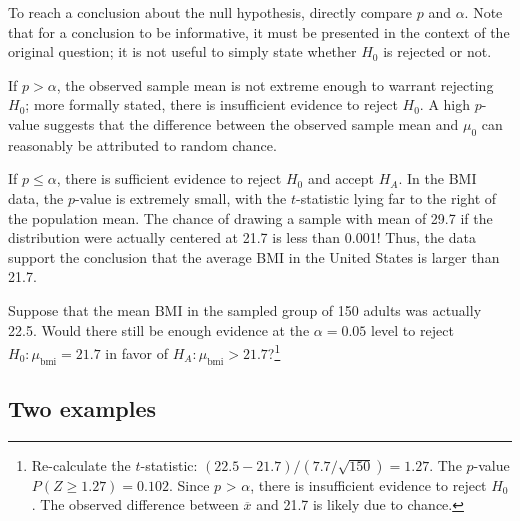 \begin{spacing}{1.5}
To reach a conclusion about the null hypothesis, directly compare $p$ and $\alpha$. Note that for a conclusion to be informative, it must be presented in the context of the original question; it is not useful to simply state whether $H_0$ is rejected or not.

If $p > \alpha$, the observed sample mean is not extreme enough to warrant rejecting $H_0$; more formally stated, there is insufficient evidence to reject $H_0$. A high $p$-value suggests that the difference between the observed sample mean and $\mu_0$ can reasonably be attributed to random chance.

If $p \leq \alpha$, there is sufficient evidence to reject $H_0$ and accept $H_A$. In the  BMI data, the $p$-value is extremely small, with the $t$-statistic lying far to the right of the population mean. The chance of drawing a sample with mean of 29.7 if the distribution were actually centered at 21.7 is less than 0.001! Thus, the data support the conclusion that the average BMI in the United States is larger than 21.7. 

\begin{exercise}
Suppose that the mean BMI in the sampled group of 150 adults was actually 22.5. Would there still be enough evidence at the $\alpha = 0.05$ level to reject $H_0: \mu_{\text{bmi}} = 21.7$ in favor of $H_A: \mu_{\text{bmi}} > 21.7$?\footnote{Re-calculate the $t$-statistic: $(22.5 - 21.7)/(7.7/\sqrt{150}) = 1.27$. The $p$-value $P(Z \geq 1.27) = 0.102$. Since $p$ > $\alpha$, there is insufficient evidence to reject $H_0$. The observed difference between $\overline{x}$ and 21.7 is likely due to chance.}
\end{exercise}

\subsection{Two examples}



\end{spacing}
